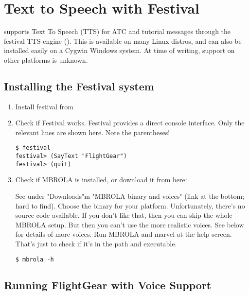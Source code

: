 \section{Text to Speech with Festival}

\FlightGear{} supports Text To Speech (TTS) for ATC and tutorial messages through the festival TTS
engine (). This is available on many Linux distros,
and can also be installed easily on a Cygwin Windows system. At time of writing, support on other platforms is unknown.

\subsection{Installing the Festival system}

\begin{enumerate}
\item Install festival from 

\item Check if Festival works. Festival provides a direct console interface. Only the relevant lines are
shown here. Note the parentheses!

\begin{verbatim}
$ festival
festival> (SayText "FlightGear")
festival> (quit)
\end{verbatim}

\item Check if MBROLA is installed, or download it from here:


See under "Downloads"m "MBROLA binary and voices"
(link at the bottom; hard to find). Choose the binary for your platform. Unfortunately, there's no
source code available. If you don't like that, then you can skip the whole MBROLA setup.
But then you can't use the more realistic voices. See below for details of more voices.
Run MBROLA and marvel at the help screen. That's just to check if it's in the path and executable.

\begin{verbatim}
$ mbrola -h
\end{verbatim}
\end{enumerate}

\subsection{Running FlightGear with Voice Support}

